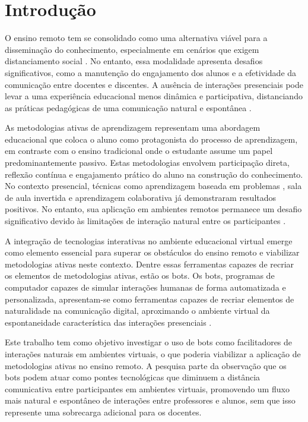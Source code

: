 \chapter{Introdução}


O ensino remoto tem se consolidado como uma alternativa viável para a disseminação do conhecimento, especialmente em cenários que exigem distanciamento social \cite{fabiane2024}. No entanto, essa modalidade apresenta desafios significativos, como a manutenção do engajamento dos alunos e a efetividade da comunicação entre docentes e discentes. A ausência de interações presenciais pode levar a uma experiência educacional menos dinâmica e participativa, distanciando as práticas pedagógicas de uma comunicação natural e espontânea \cite{fabiane2024}.

As metodologias ativas \cite{prince2004} de aprendizagem representam uma abordagem educacional que coloca o aluno como protagonista do processo de aprendizagem, em contraste com o ensino tradicional onde o estudante assume um papel predominantemente passivo. Estas metodologias envolvem participação direta, reflexão contínua e engajamento prático do aluno na construção do conhecimento. No contexto presencial, técnicas como aprendizagem baseada em problemas \cite{yew2016}, sala de aula invertida \cite{vanalten2019} e aprendizagem colaborativa \cite{laal2012} já demonstraram resultados positivos. No entanto, sua aplicação em ambientes remotos permanece um desafio significativo devido às limitações de interação natural entre os participantes \cite{fabiane2024}.

A integração de tecnologias interativas no ambiente educacional virtual emerge como elemento essencial para superar os obstáculos do ensino remoto e viabilizar metodologias ativas neste contexto. Dentre essas ferramentas capazes de recriar os elementos de metodologias ativas, estão os bots. Os bots, programas de computador capazes de simular interações humanas de forma automatizada e personalizada, apresentam-se como ferramentas capazes de recriar elementos de naturalidade na comunicação digital, aproximando o ambiente virtual da espontaneidade característica das interações presenciais \cite{okonkwo2021}.

Este trabalho tem como objetivo investigar o uso de bots como facilitadores de interações naturais em ambientes virtuais, o que poderia viabilizar a aplicação de metodologias ativas no ensino remoto. A pesquisa parte da observação que os bots podem atuar como pontes tecnológicas que diminuem a distância comunicativa entre participantes em ambientes virtuais, promovendo um fluxo mais natural e espontâneo de interações entre professores e alunos, sem que isso represente uma sobrecarga adicional para os docentes.

